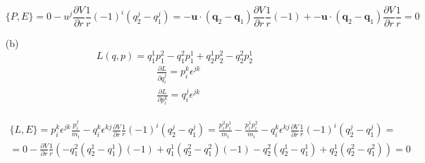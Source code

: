 \begin{enumerate}
\[
\lbrace P,E \rbrace =0 - u^j \frac{ \partial V}{ \partial r} \frac{1}{r} (-1)^i(q_2^j-q_1^j) = -\mathbf{u}\cdot(\mathbf{q}_2-\mathbf{q}_1) \frac{ \partial V}{ \partial r} \frac{1}{r}(-1) + -\mathbf{u}\cdot (\mathbf{q}_2-\mathbf{q}_1) \frac{ \partial V}{ \partial r} \frac{1}{r} = 0 
\]

\item[(b)] 
\[
L(q,p) = q_1^1 p_1^2 - q_1^2 p_1^1 + q_2^1p_2^2 - q_2^2 p_2^1 
\]
\[
\begin{aligned}
  & \frac{ \partial L}{ \partial q_i^j } = p_i^k \epsilon^{jk} \\ 
  & \frac{ \partial L}{ \partial p_i^k } = q_i^j \epsilon^{jk}
\end{aligned}
\]


\[
\begin{gathered}
  \lbrace L, E \rbrace = p_i^k \epsilon^{jk} \frac{p_i^j}{m_i} - q_i^k \epsilon^{kj} \frac{ \partial V}{ \partial r} \frac{1}{r} (-1)^i (q_2^j - q_1^j) = \frac{ p_i^2 p_i^1}{m_i} - \frac{ p_i^1 p_i^2}{m_i} -  q_i^k \epsilon^{kj} \frac{ \partial V}{ \partial r} \frac{1}{r} (-1)^i (q^j_2 - q^j_1) = \\
  = 0 - \frac{ \partial V}{ \partial r} \frac{1}{r} ( -q_1^2(q_2^1- q_1^1 )(-1) + q_1^1 (q_2^2 - q_1^2)(-1) - q_2^2 (q_2^1 - q_1^1) + q_2^1 (q_2^2 - q_1^2) ) = 0 
\end{gathered}
\]



\end{enumerate}



